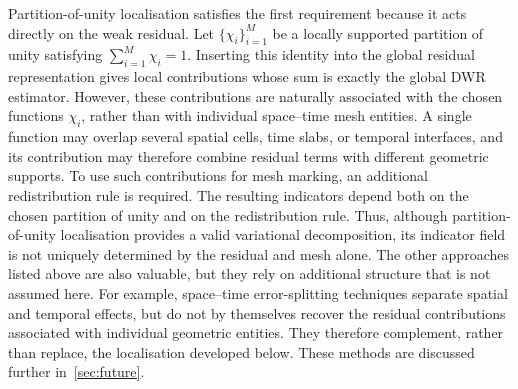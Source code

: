 Partition-of-unity localisation satisfies the first requirement because it acts directly on the weak residual. Let $\{\chi_i\}_{i=1}^{M}$ be a locally supported partition of unity satisfying
\(
\sum_{i=1}^{M}\chi_i=1.
\)
Inserting this identity into the global residual representation gives local contributions whose sum is exactly the global DWR estimator. 
However, these contributions are naturally associated with the chosen functions $\chi_i$, rather than with individual space--time mesh entities. A single function may overlap several spatial cells, time slabs, or temporal interfaces, and its contribution may therefore combine residual terms with different geometric supports. To use such contributions for mesh marking, an additional redistribution rule is required. The resulting indicators depend both on the chosen partition of unity and on the redistribution rule. Thus, although partition-of-unity localisation provides a valid variational decomposition, its indicator field is not uniquely determined by the residual and mesh alone.
The other approaches listed above are also valuable, but they rely on additional structure that is not assumed here. For example, space--time error-splitting techniques separate spatial and temporal effects, but do not by themselves recover the residual contributions associated with individual geometric entities. They therefore complement, rather than replace, the localisation developed below. These methods are discussed further in~\cref{sec:future}.

